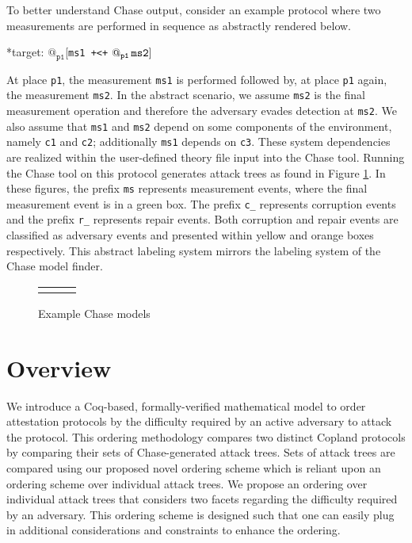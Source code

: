 \documentclass[runningheads]{llncs}
\theoremstyle{definition}
\begin{document}
To better understand Chase output, consider an example protocol where two measurements are performed in sequence as abstractly rendered below.

\begin{center}
    *target: $@_{\texttt{p1}}$[\texttt{ms1 +<+} $\mathop{@_{\texttt{p1}}}{\texttt{ms2}}]$
\end{center}

\noindent At place \texttt{p1}, the measurement \texttt{ms1} is performed followed by, at place \texttt{p1} again, the measurement \texttt{ms2}. In the abstract scenario, we assume \texttt{ms2} is the final measurement operation and therefore the adversary evades detection at \texttt{ms2}. We also assume that \texttt{ms1} and \texttt{ms2} depend on some components of the environment, namely \texttt{c1} and \texttt{c2}; additionally \texttt{ms1} depends on \texttt{c3}. These system dependencies are realized within the user-defined theory file input into the Chase tool. Running the Chase tool on this protocol generates attack trees as found in Figure \ref{fig:chase-ex}. In these figures, the prefix \texttt{ms} represents measurement events, where the final measurement event is in a green box. The prefix \texttt{c\_} represents corruption events and the prefix \texttt{r\_} represents repair events. Both corruption and repair events are classified as adversary events and presented within yellow and orange boxes respectively. This abstract labeling system mirrors the labeling system of the Chase model finder. 

\begin{figure}[hbtp]
    \centering 
    \begin{tabular}{c c c}
         &  &  
    \end{tabular}
    \caption[Example Chase Models]{Example Chase models}
    \label{fig:chase-ex}
\end{figure}




\section{Overview}
We introduce a Coq-based, formally-verified mathematical model to order attestation protocols by the difficulty required by an active adversary to attack the protocol. This ordering methodology compares two distinct Copland protocols by comparing their sets of Chase-generated attack trees. Sets of attack trees are compared using our proposed novel ordering scheme which is reliant upon an ordering scheme over individual attack trees. We propose an ordering over individual attack trees that considers two facets regarding the difficulty required by an adversary. This ordering scheme is designed such that one can easily plug in additional considerations and constraints to enhance the ordering.
\end{document}
